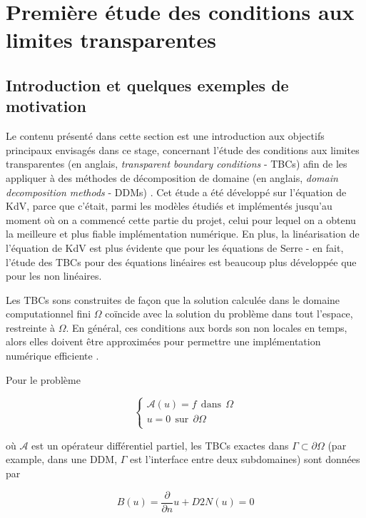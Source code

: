 \section{Première étude des conditions aux limites transparentes}
\label{sec:TBC}

\subsection{Introduction et quelques exemples de motivation}

\indent Le contenu présenté dans cette section est une introduction aux objectifs principaux envisagés dans ce stage, concernant l'étude des conditions aux limites transparentes (en anglais, \emph{transparent boundary conditions} - TBCs) afin de les appliquer à des méthodes de décomposition de domaine (en anglais, \emph{domain decomposition methods} - DDMs) . Cet étude a été développé sur l'équation de KdV, parce que c'était, parmi les modèles étudiés et implémentés jusqu'au moment où on a commencé cette partie du projet, celui pour lequel on a obtenu la meilleure et plus fiable implémentation numérique. En plus, la linéarisation de l'équation de KdV est plus évidente que pour les équations de Serre - en fait, l'étude des TBCs pour des équations linéaires est beaucoup plus développée que pour les non linéaires.

\indent Les TBCs sons construites de façon que la solution calculée dans le domaine computationnel fini $\Omega$ coïncide avec la solution du problème dans tout l'espace, restreinte à $\Omega$. En général, ces conditions aux bords son non locales en temps, alors elles doivent être approximées pour permettre une implémentation numérique efficiente \cite{Xavieretal2008}.

\indent Pour le problème

\begin{equation*}
\begin{cases}
\mathcal{A}(u) = f \ \ \text{dans} \ \ \Omega\\
u = 0 \ \ \text{sur} \ \ \partial\Omega\\
\end{cases}
\end{equation*}

\noindent où $\mathcal{A}$ est un opérateur différentiel partiel, les TBCs exactes dans $\Gamma \subset \partial\Omega$ (par example, dans une DDM, $\Gamma$ est l'interface entre deux subdomaines) sont données par \cite{Japhet2003}

\begin{equation}
\label{eq:exactTBC}
B(u) = \frac{\partial}{\partial n}u + D2N(u) = 0
\end{equation}

